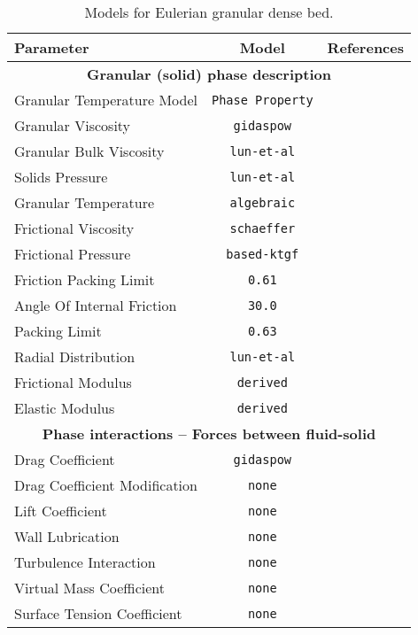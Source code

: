 \begin{table}[!ht]
\caption{\label{tab:eulerian-dense-bed}Models for Eulerian granular dense bed.}
\small\centering%
\begin{tabular}{lcc}
\toprule[2pt]
  \textbf{Parameter}
& \textbf{Model}
& \textbf{References}
\\
\midrule[1pt]
\multicolumn{3}{c}{\textbf{Granular (solid) phase description}}\\
\midrule
  Granular Temperature Model
& \Verb|Phase Property|
&
\\[6pt]
  Granular Viscosity
& \Verb|gidaspow|
& \cite{Gidaspow1992}
\\[6pt]
  Granular Bulk Viscosity
& \Verb|lun-et-al|
& \cite{Lun1984}
\\[6pt]
  Solids Pressure
& \Verb|lun-et-al|
& \cite{Lun1984}
\\[6pt]
  Granular Temperature
& \Verb|algebraic|
&
\\[6pt]
  Frictional Viscosity
& \Verb|schaeffer|
& \cite{Schaeffer1987}
\\[6pt]
  Frictional Pressure
& \Verb|based-ktgf|
& 
\\[6pt]
  Friction Packing Limit
& \Verb|0.61|
&
\\[6pt]
  Angle Of Internal Friction
& \Verb|30.0|
&
\\[6pt]
  Packing Limit
& \Verb|0.63|
&
\\[6pt]
  Radial Distribution
& \Verb|lun-et-al|
& \cite{Lun1984}
\\[6pt]
  Frictional Modulus
& \Verb|derived|
&
\\[6pt]
  Elastic Modulus
& \Verb|derived|
&
\\
\midrule
\multicolumn{3}{c}{\textbf{Phase interactions -- Forces between fluid-solid}}\\
\midrule
  Drag Coefficient
& \Verb|gidaspow|
& \cite{Ergun1952,Wen1966,Gidaspow1992}
\\[6pt]
  Drag Coefficient Modification
& \Verb|none|
& 
\\[6pt]
  Lift Coefficient
& \Verb|none|
& 
\\[6pt]
  Wall Lubrication
& \Verb|none|
& 
\\[6pt]
  Turbulence Interaction
& \Verb|none|
& 
\\[6pt]
  Virtual Mass Coefficient
& \Verb|none|
& 
\\[6pt]
  Surface Tension Coefficient
& \Verb|none|
& 
\\
\midrule

\end{tabular}
\end{table}
